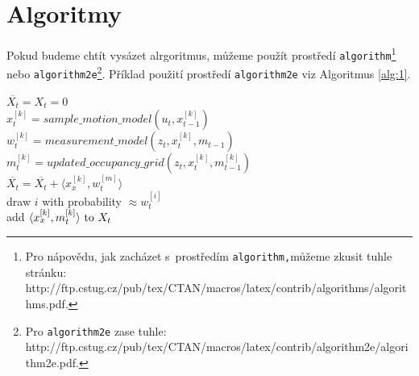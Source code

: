 \documentclass[11pt,a4paper,titlepage]{article}
\begin{document}
\section{Algoritmy \label{sec:Algoritmy}}
Pokud budeme chtít vysázet alrgoritmus, můžeme použít prostředí \texttt{algorithm}\footnote{Pro nápovědu, jak zacházet s~prostředím \texttt{algorithm,}můžeme zkusit tuhle stránku:\\
http://ftp.cstug.cz/pub/tex/CTAN/macros/latex/contrib/algorithms/algorithms.pdf.} nebo \texttt{algorithm2e}\footnote{Pro \texttt{algorithm2e} zase tuhle: http://ftp.cstug.cz/pub/tex/CTAN/macros/latex/contrib/algorithm2e/algorithm2e.pdf.}. Příklad použití prostředí \texttt{algorithm2e} viz Algoritmus \ref{alg:1}.
\bigskip

\begin{algorithm}[ht]
\caption{F\small AST\normalsize SLAM}
\label{alg:1}
\SetNlSty{}{}{:  }
\SetInd{1em}{1em}
\SetNlSkip{-1.33em}

\BlankLine
\Indp\Indp

$\overline{X_t} = X_t = 0$\\
{
	$x_t^{[k]} = sample\_motion\_model(u_t,x_{t-1}^{[k]})$\\
    $w_t^{[k]} = measurement\_model(z_t,x_t^{[k]},m_{t-1})$\\
    $m_t^{[k]} = updated\_occupancy\_grid(z_t,x_t^{[k]},m_{t-1}^{[k]})$\\
    $\overline{X_t} = \overline{X_t} +\langle x_x^{[k]},w_t^{[m]}\rangle$\\
}
{
	draw $i$ with probability $\approx w_t^{[i]}$ \\
    add $\langle x_x^{[k]},m_t^{[k]} \rangle \textnormal{ to } X_t$\\
}
\end{algorithm}
\end{document}
